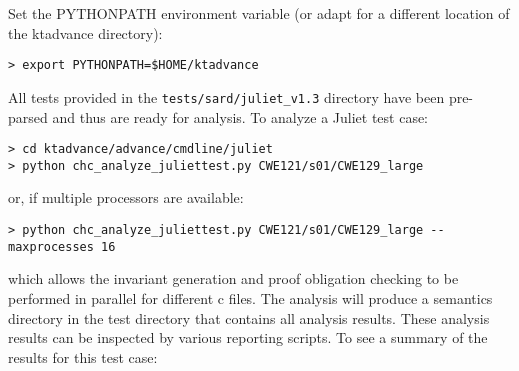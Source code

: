 \documentclass[11pt]{article}
\begin{document}
Set the PYTHONPATH environment variable (or adapt for a different location of the ktadvance
directory):
\begin{verbatim}
> export PYTHONPATH=$HOME/ktadvance
\end{verbatim}
All tests provided in the {\tt tests/sard/juliet\_v1.3} directory have been pre-parsed and
thus are ready for analysis. To analyze a Juliet test case:
\begin{verbatim}
> cd ktadvance/advance/cmdline/juliet
> python chc_analyze_juliettest.py CWE121/s01/CWE129_large
\end{verbatim}
or, if multiple processors are available:
\begin{verbatim}
> python chc_analyze_juliettest.py CWE121/s01/CWE129_large --maxprocesses 16
\end{verbatim}
which allows the invariant generation and proof obligation checking to be
performed in parallel for different c files.
The analysis will produce a semantics directory in the test directory that contains all analysis
results. These analysis results can be inspected by various reporting scripts.
To see a summary of the results for this test case:
\end{document}
